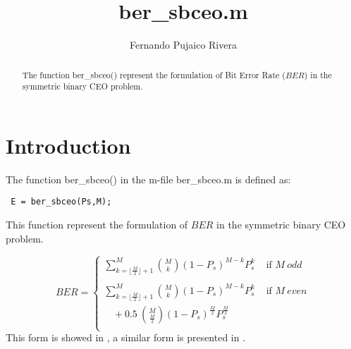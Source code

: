 \documentclass[a4paper,10pt]{article}
\title{ber\_sbceo.m}
\author{Fernando Pujaico Rivera}
\begin{document}
\maketitle
\begin{abstract}
The function ber\_sbceo() represent the formulation of Bit Error Rate ($BER$) 
in the symmetric binary CEO problem.
\end{abstract}

\section{Introduction}
The function ber\_sbceo() in the m-file ber\_sbceo.m is defined as:
\lstset{language=octave}%
\begin{lstlisting}
 E = ber_sbceo(Ps,M);
\end{lstlisting}
This function represent the formulation of $BER$ in the symmetric binary CEO problem.

\begin{equation}\label{eq:bersbceo}
BER= 
\begin{cases}
\sum \limits_{k=\lfloor \frac{M}{2} \rfloor +1}^{M} \binom{M}{k}  (1-P_s)^{M-k} P_s^k & \text{ if } M~odd \\ 
~ & ~ \\
\sum \limits_{k=\lfloor \frac{M}{2} \rfloor +1}^{M} \binom{M}{k}  (1-P_s)^{M-k} P_s^k & \text{ if } M~even \\
~~~~+0.5~\binom{M}{\frac{M}{2}}  (1-P_s)^{\frac{M}{2}} P_s^{\frac{M}{2}} & ~ \\
\end{cases}
\end{equation}
This form is showed in \cite{berbinaryceo}, a similar form is presented in \cite{Abrardo2009,Ferrari2012}.
\end{document}
